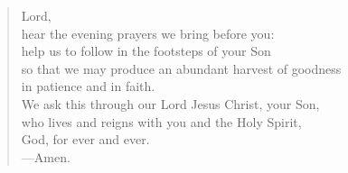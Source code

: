 \prayer

\setlength{\vleftmargin}{\prayerleftmargini}

\begin{verse}
Lord,\\
hear the evening prayers we bring before you:\\
help us to follow in the footsteps of your Son\\
so that we may produce an abundant harvest of goodness\\
in patience and in faith.\\
We ask this through our Lord Jesus Christ, your Son,\\
who lives and reigns with you and the Holy Spirit,\\
God, for ever and ever.\\
{\color{red}---\thinspace}Amen.
\end{verse}

\setlength{\vleftmargin}{\defleftmargini}